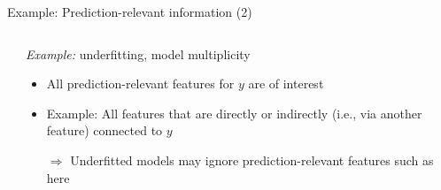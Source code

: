 \documentclass[11pt,compress,t,notes=noshow, aspectratio=169, xcolor=table]{beamer}
\begin{document}
\begin{frame}{Example: Prediction-relevant information (2)}
\begin{columns}[T, totalwidth=\textwidth]
\begin{column}{0.52\textwidth}
{
}
  \end{column}
  \begin{column}{0.48\textwidth}
  \textit{Example:} underfitting, model multiplicity
  \pause
      \begin{itemize}
      \item All prediction-relevant features for $y$ are of interest
      \item Example: All features that are directly or indirectly (i.e., via another feature) connected to $y$ 
      \item[$\Rightarrow$] Underfitted models may ignore prediction-relevant features such as  here
  \end{itemize}
  \end{column}
\end{columns}
\end{frame}
\end{document}
